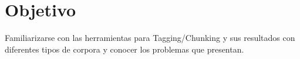 \section{Objetivo}

Familiarizarse con las herramientas para Tagging/Chunking y sus resultados con diferentes tipos de corpora y conocer los problemas que presentan.

